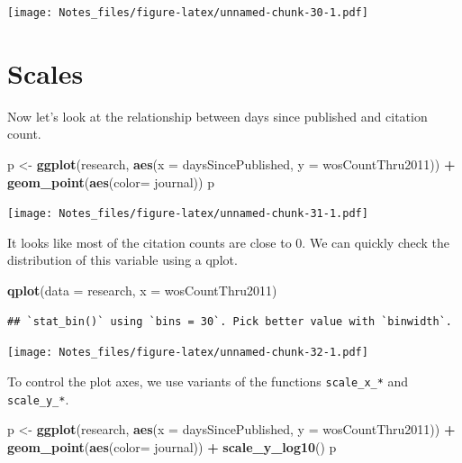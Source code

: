 \documentclass[
]{book}
\newenvironment{Shaded}{\begin{snugshade}}{\end{snugshade}}
\newcommand{\DataTypeTok}[1]{\textcolor[rgb]{0.13,0.29,0.53}{#1}}
\newcommand{\KeywordTok}[1]{\textcolor[rgb]{0.13,0.29,0.53}{\textbf{#1}}}
\newcommand{\NormalTok}[1]{#1}
\newcommand{\OperatorTok}[1]{\textcolor[rgb]{0.81,0.36,0.00}{\textbf{#1}}}
\newcommand{\StringTok}[1]{\textcolor[rgb]{0.31,0.60,0.02}{#1}}
\begin{document}
\texttt{[image: Notes\_files/figure-latex/unnamed-chunk-30-1.pdf]}

\hypertarget{scales}{%
\section{Scales}\label{scales}}

Now let's look at the relationship between days since published and citation count.

\begin{Shaded}
\begin{Highlighting}[]
\NormalTok{p <-}\StringTok{ }\KeywordTok{ggplot}\NormalTok{(research, }\KeywordTok{aes}\NormalTok{(}\DataTypeTok{x =}\NormalTok{ daysSincePublished, }
                          \DataTypeTok{y =}\NormalTok{ wosCountThru2011)) }\OperatorTok{+}\StringTok{ }
\StringTok{  }\KeywordTok{geom_point}\NormalTok{(}\KeywordTok{aes}\NormalTok{(}\DataTypeTok{color=}\NormalTok{ journal))}
\NormalTok{p}
\end{Highlighting}
\end{Shaded}

\texttt{[image: Notes\_files/figure-latex/unnamed-chunk-31-1.pdf]}

It looks like most of the citation counts are close to 0. We can quickly check the distribution of this variable using a qplot.

\begin{Shaded}
\begin{Highlighting}[]
\KeywordTok{qplot}\NormalTok{(}\DataTypeTok{data =}\NormalTok{ research, }\DataTypeTok{x =}\NormalTok{ wosCountThru2011)}
\end{Highlighting}
\end{Shaded}

\begin{verbatim}
## `stat_bin()` using `bins = 30`. Pick better value with `binwidth`.
\end{verbatim}

\texttt{[image: Notes\_files/figure-latex/unnamed-chunk-32-1.pdf]}

To control the plot axes, we use variants of the functions \texttt{scale\_x\_*} and \texttt{scale\_y\_*}.

\begin{Shaded}
\begin{Highlighting}[]
\NormalTok{p <-}\StringTok{ }\KeywordTok{ggplot}\NormalTok{(research, }\KeywordTok{aes}\NormalTok{(}\DataTypeTok{x =}\NormalTok{ daysSincePublished, }
                          \DataTypeTok{y =}\NormalTok{ wosCountThru2011)) }\OperatorTok{+}\StringTok{ }
\StringTok{  }\KeywordTok{geom_point}\NormalTok{(}\KeywordTok{aes}\NormalTok{(}\DataTypeTok{color=}\NormalTok{ journal)) }\OperatorTok{+}
\StringTok{  }\KeywordTok{scale_y_log10}\NormalTok{()}
\NormalTok{p}
\end{Highlighting}
\end{Shaded}
\end{document}
